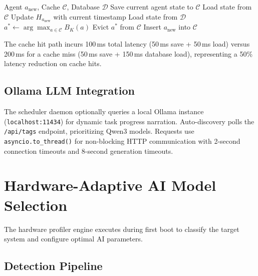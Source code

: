 \documentclass[conference]{IEEEtran}
\begin{document}
\begin{algorithm}[htbp]
\caption{LRU-K Context Switch}
\label{alg:lruk}
\begin{algorithmic}[1]
\REQUIRE Agent $a_{\text{new}}$, Cache $\mathcal{C}$, Database $\mathcal{D}$
\STATE Save current agent state to $\mathcal{C}$ 
    \STATE Load state from $\mathcal{C}$ 
    \STATE Update $H_{a_{\text{new}}}$ with current timestamp
\ELSE
    \STATE Load state from $\mathcal{D}$ 
        \STATE $a^* \leftarrow \arg\max_{a \in \mathcal{C}} B_K(a)$
        \STATE Evict $a^*$ from $\mathcal{C}$
    \ENDIF
    \STATE Insert $a_{\text{new}}$ into $\mathcal{C}$
\ENDIF
\end{algorithmic}
\end{algorithm}

The cache hit path incurs 100\,ms total latency (50\,ms save + 50\,ms load) versus 200\,ms for a cache miss (50\,ms save + 150\,ms database load), representing a 50\% latency reduction on cache hits.

\subsection{Ollama LLM Integration}

The scheduler daemon optionally queries a local Ollama instance (\texttt{localhost:11434}) for dynamic task progress narration. Auto-discovery polls the \texttt{/api/tags} endpoint, prioritizing Qwen3 models. Requests use \texttt{asyncio.to\_thread()} for non-blocking HTTP communication with 2-second connection timeouts and 8-second generation timeouts.


\section{Hardware-Adaptive AI Model Selection}
\label{sec:hardware}

The hardware profiler engine executes during first boot to classify the target system and configure optimal AI parameters.

\subsection{Detection Pipeline}
\end{document}
